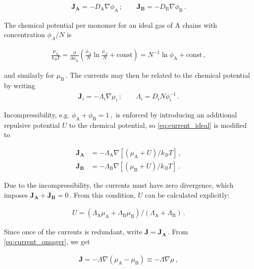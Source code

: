 \documentclass[bachelor,       %
               twoside,        %
               BCOR10mm,       %
                ngerman,english  %
               ]{GAUBM}
\begin{document}
\begin{align}
  \mathbf{J_A}=-D_\mathrm A\nabla\phi_\mathrm A\,; \qquad \mathbf{J_B}=-D_\mathrm B\nabla\phi_\mathrm B\,.
\end{align}

The chemical potential per monomer for an ideal gas of A chains with concentration $\phi_A/N$ is

\begin{align}
  \frac{\mu_\mathrm A}{k_BT}=\frac{\partial}{\partial\phi_\mathrm A}\left(\frac{\phi_A}{N}\ln\frac{\phi_A}{N}+\mathrm{const}\right)=N^{-1}\ln\phi_\mathrm A +\mathrm{const}\,,
\end{align}

and similarly for $\mu_\mathrm B\,.$ The currents may then be related to the chemical potential by writing
\begin{align}
  \mathbf{J}_i=-\Lambda_i\nabla\mu_i\,; \qquad \Lambda_i=D_iN\phi_i^{-1}\,.
  \label{eq:current_ideal}
\end{align}

Incompressibility, e.g. $\phi_\mathrm A+\phi_\mathrm B=1\,,$ is enforced by introducing an additional repulsive potential $U$ to the chemical potential, so \eqref{eq:current_ideal} is modified to

\begin{subequations}
  \begin{align}
    \mathbf{J_A}&=-\Lambda_\mathrm A\nabla [(\mu_\mathrm A + U)/k_BT]\,,\\
    \mathbf{J_B}&=-\Lambda_\mathrm B\nabla [(\mu_\mathrm B + U)/k_BT]\,.
  \end{align}
  \label{eq:current_onsager}
\end{subequations}

Due to the incompressibility, the currents must have zero divergence, which imposes $\mathbf{J_A}+\mathbf{J_B}=0\,.$ From this condition, $U$ can be calculated explicitly:

\begin{align}
  U=(\Lambda_\mathrm A\mu_\mathrm A+\Lambda_\mathrm B\mu_\mathrm B)/(\Lambda_\mathrm A+\Lambda_\mathrm B)\,.
\end{align}

Since once of the currents is redundant, write $\mathbf{J}=\mathbf{J_A}\,.$ From \eqref{eq:current_onsager}, we get

\begin{align}
  \mathbf J=-\Lambda\nabla(\mu_\mathrm A - \mu_\mathrm B)\equiv -\Lambda\nabla\mu\,,
\end{align}
\end{document}
